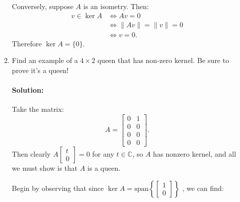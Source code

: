 \documentclass{article}
\begin{document}
\begin{enumerate}
\begin{enumerate}[label= (\alph*)]
    Conversely, suppose $A$ is an isometry. Then:
    \begin{align*}
        v\in \ker A&\iff Av=0\\
                   &\iff \|Av\|=\|v\|=0\\
                   &\iff v=0
    .\end{align*}
    Therefore $\ker A=\{0\} $. 

\item Find an example of a $4 \times  2$ queen that has non-zero kernel. Be sure to prove it's a queen!
    \paragraph{Solution: }Take the matrix:
    \[
        A=\begin{bmatrix} 0&1\\0&0\\ 0&0\\0&0  \end{bmatrix} 
    .\] 
    Then clearly $A\begin{bmatrix} t\\0 \end{bmatrix} =0$ for any $t\in \mathbb{C}$, so $A$ has nonzero kernel, and all we must show is that $A$ is a queen.

    Begin by observing that since $\ker A=\text{span} \left\{ \begin{bmatrix} 1\\0 \end{bmatrix}  \right\} $
    , we can find:


\end{enumerate}
\end{enumerate}
\end{document}
